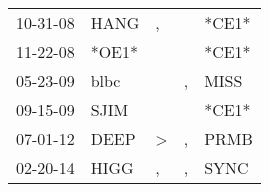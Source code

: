 \begin{supertabular}{p{0.07\textwidth}p{0.06\textwidth}p{0.02\textwidth}p{0.02\textwidth}p{0.06\textwidth}}
 10-31-08\textsuperscript{} &  HANG\textsuperscript{} &             , &    &                   *CE1* \\
 11-22-08\textsuperscript{} &                   *OE1* &               &    &                   *CE1* \\
 05-23-09\textsuperscript{} &  blbc\textsuperscript{} &               &  , &  MISS\textsuperscript{} \\
 09-15-09\textsuperscript{} &  SJIM\textsuperscript{} &               &    &                   *CE1* \\
 07-01-12\textsuperscript{} &  DEEP\textsuperscript{} &  \textgreater &  , &  PRMB\textsuperscript{} \\
 02-20-14\textsuperscript{} &  HIGG\textsuperscript{} &             , &  , &  SYNC\textsuperscript{} \\
\end{supertabular}
